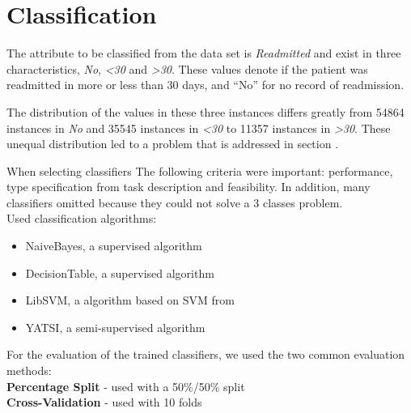 \section{Classification}
\label{classification}

The attribute to be classified from the data set is \textit{Readmitted} and exist in three characteristics, \textit{No},\textit{ \textless 30} and \textit{ \textgreater 30}. These values denote if the patient was readmitted in more or less than 30 days, and “No” for no record of readmission. \cite{OlmoMedicos}

The distribution of the values in these three instances differs greatly from 54864 instances in \textit{No} and 35545 instances in \textit{ \textless 30} to 11357 instances in \textit{ \textgreater 30}. These unequal distribution led to a problem that is addressed in section . 

When selecting classifiers The following criteria were important: performance, type specification from task description and feasibility.
In addition, many classifiers omitted because they could not solve a 3 classes problem.
\\

Used classification algorithms:
\begin{itemize}
	\item[\textbullet] NaiveBayes, a supervised algorithm 
	\item[\textbullet] DecisionTable, a supervised algorithm 
	\item[\textbullet] LibSVM, a algorithm based on SVM from 
	\item[\textbullet] YATSI, a semi-supervised algorithm
\end{itemize}



For the evaluation of the trained classifiers, we used the two common evaluation methods:\\
\textbf{Percentage Split} - used with a 50\%/50\% split\\
\textbf{Cross-Validation} - used with 10 folds\\



